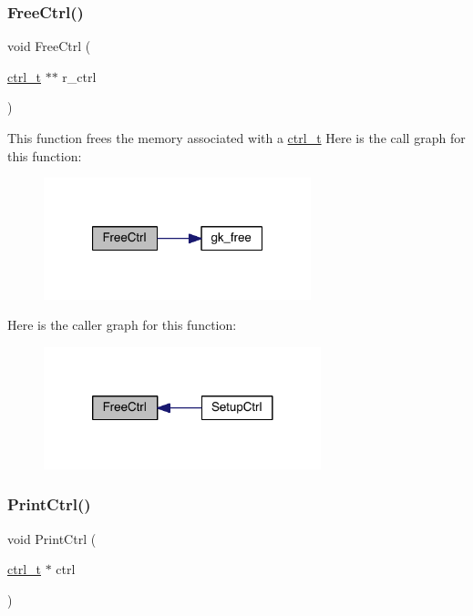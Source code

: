 \subsubsection{\texorpdfstring{Free\+Ctrl()}{FreeCtrl()}}
{\footnotesize\ttfamily void Free\+Ctrl (\begin{DoxyParamCaption}\item[{\hyperlink{a00742}{ctrl\+\_\+t} $\ast$$\ast$}]{r\+\_\+ctrl }\end{DoxyParamCaption})}

This function frees the memory associated with a \hyperlink{a00742}{ctrl\+\_\+t} Here is the call graph for this function\+:\nopagebreak
\begin{figure}[H]
\begin{center}
\leavevmode
\includegraphics[width=220pt]{a00254_ab44b3384fa925eae532b7bcc825159d7_cgraph}
\end{center}
\end{figure}
Here is the caller graph for this function\+:\nopagebreak
\begin{figure}[H]
\begin{center}
\leavevmode
\includegraphics[width=228pt]{a00254_ab44b3384fa925eae532b7bcc825159d7_icgraph}
\end{center}
\end{figure}
\mbox{\label{a00254_a2c75ede1a41b19cb3705b998aba3200b}} 
\subsubsection{\texorpdfstring{Print\+Ctrl()}{PrintCtrl()}}
{\footnotesize\ttfamily void Print\+Ctrl (\begin{DoxyParamCaption}\item[{\hyperlink{a00742}{ctrl\+\_\+t} $\ast$}]{ctrl }\end{DoxyParamCaption})}

